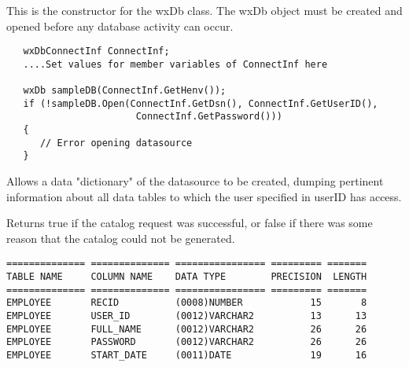 



This is the constructor for the wxDb class.  The wxDb object must
be created and opened before any database activity can occur.


\begin{verbatim}
   wxDbConnectInf ConnectInf;
   ....Set values for member variables of ConnectInf here

   wxDb sampleDB(ConnectInf.GetHenv());
   if (!sampleDB.Open(ConnectInf.GetDsn(), ConnectInf.GetUserID(),
	                   ConnectInf.GetPassword()))
   {
      // Error opening datasource
   }
\end{verbatim}



\label{wxdbcatalog}


Allows a data "dictionary" of the datasource to be created, dumping pertinent
information about all data tables to which the user specified in userID has
access.





Returns true if the catalog request was successful, or false if there was some
reason that the catalog could not be generated.


\begin{verbatim}
============== ============== ================ ========= =======
TABLE NAME     COLUMN NAME    DATA TYPE        PRECISION  LENGTH
============== ============== ================ ========= =======
EMPLOYEE       RECID          (0008)NUMBER            15       8
EMPLOYEE       USER_ID        (0012)VARCHAR2          13      13
EMPLOYEE       FULL_NAME      (0012)VARCHAR2          26      26
EMPLOYEE       PASSWORD       (0012)VARCHAR2          26      26
EMPLOYEE       START_DATE     (0011)DATE              19      16
\end{verbatim}


